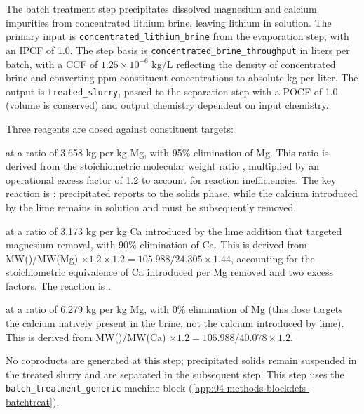 The batch treatment step precipitates dissolved magnesium and calcium impurities from concentrated lithium brine, leaving lithium in solution. The primary input is \texttt{concentrated\_lithium\_brine} from the evaporation step, with an IPCF of 1.0. The step basis is \texttt{concentrated\_brine\_throughput} in liters per batch, with a CCF of $1.25 \times 10^{-6}$ kg/L reflecting the density of concentrated brine and converting ppm constituent concentrations to absolute kg per liter. The output is \texttt{treated\_slurry}, passed to the separation step with a POCF of 1.0 (volume is conserved) and output chemistry dependent on input chemistry.

Three reagents are dosed against constituent targets:
\begin{description}[noitemsep, topsep=0pt]
	\item[\textbullet\enskip Slaked lime \ce{Ca(OH)2} targeting Mg] at a ratio of 3.658 kg  per kg Mg, with 95\% elimination of Mg. This ratio is derived from the stoichiometric molecular weight ratio , multiplied by an operational excess factor of 1.2 to account for reaction inefficiencies. The key reaction is ; precipitated  reports to the solids phase, while the calcium introduced by the lime remains in solution and must be subsequently removed.
	\item[\textbullet\enskip Soda ash \ce{Na2CO3} targeting Ca (calcium introduced by lime)] at a ratio of 3.173 kg  per kg Ca introduced by the lime addition that targeted magnesium removal, with 90\% elimination of Ca. This is derived from MW()/MW(Mg) $\times 1.2 \times 1.2 = 105.988/24.305 \times 1.44$, accounting for the stoichiometric equivalence of Ca introduced per Mg removed and two excess factors. The reaction is .
	\item[\textbullet\enskip Soda ash \ce{Na2CO3} targeting Mg (as a secondary Ca removal dose)] at a ratio of 6.279 kg  per kg Mg, with 0\% elimination of Mg (this dose targets the calcium natively present in the brine, not the calcium introduced by lime). This is derived from MW()/MW(Ca) $\times 1.2 = 105.988/40.078 \times 1.2$.
\end{description}

No coproducts are generated at this step; precipitated solids remain suspended in the treated slurry and are separated in the subsequent step. This step uses the \texttt{batch\_treatment\_generic} machine block (\ref{app:04-methods-blockdefs-batchtreat}).

